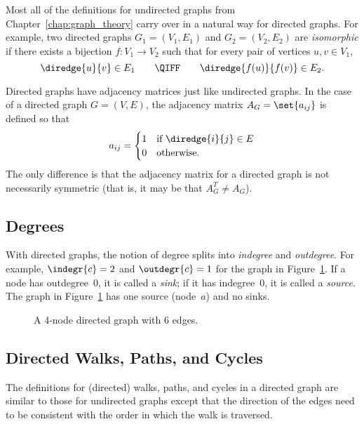 Most all of the definitions for undirected graphs from
Chapter~\ref{chap:graph_theory} carry over in a natural way for
directed graphs.  For example, two directed graphs $G_1 = (V_1, E_1)$
and $G_2 = (V_2, E_2)$ are \emph{isomorphic} if there exists a
bijection $f: V_1 \to V_2$ such that for every pair of vertices $u, v
\in V_1$,
\begin{equation*}
    \diredge{u}{v} \in E_1 \qquad \QIFF \qquad \diredge{f(u)}{f(v)} \in E_2.
\end{equation*}

Directed graphs have adjacency matrices just like undirected graphs.
In the case of a directed graph $G = (V, E)$, the adjacency matrix
$A_G = \set{ a_{ij} }$ is defined so that
\begin{equation*}
    a_{ij} = \begin{cases}
                1 & \text{if $\diredge{i}{j} \in E$} \\
                0 & \text{otherwise.}
              \end{cases}
\end{equation*}
The only difference is that the adjacency matrix for a directed graph
is not necessarily symmetric (that is, it may be that
$A_{G}^{T} \ne A_G$).

\subsection{Degrees}

With directed graphs, the notion of degree splits into \emph{indegree}
and \emph{outdegree}.  For example, $\indegr{c} = 2$ and $\outdegr{c}
= 1$ for the graph in Figure~\ref{fig:6EB}.  If a node has
outdegree~0, it is called a \emph{sink}; if it has indegree~0, it is
called a \emph{source}.  The graph in Figure~\ref{fig:6EB} has one
source (node~$a$) and no sinks.

\begin{figure}

\missinggraphic

\caption{A 4-node directed graph with 6 edges.}

\label{fig:6EB}

\end{figure}

\subsection{Directed Walks, Paths, and Cycles}

The definitions for (directed) walks, paths, and cycles in a directed
graph are similar to those for undirected graphs except that the
direction of the edges need to be consistent with the order in which
the walk is traversed.

